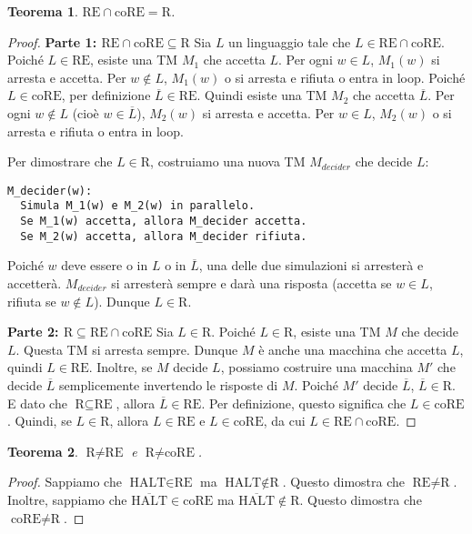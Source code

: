 \documentclass[a4paper]{article}
\newtheorem{theorem}{Teorema}
\begin{document}
\begin{theorem}
$\text{RE} \cap \text{coRE} = \text{R}$.
\end{theorem}
\begin{proof}
\textbf{Parte 1: $\text{RE} \cap \text{coRE} \subseteq \text{R}$}
Sia $L$ un linguaggio tale che $L \in \text{RE} \cap \text{coRE}$.
Poiché $L \in \text{RE}$, esiste una TM $M_1$ che accetta $L$. Per ogni $w \in L$, $M_1(w)$ si arresta e accetta. Per $w \notin L$, $M_1(w)$ o si arresta e rifiuta o entra in loop.
Poiché $L \in \text{coRE}$, per definizione $\overline{L} \in \text{RE}$. Quindi esiste una TM $M_2$ che accetta $\overline{L}$. Per ogni $w \notin L$ (cioè $w \in \overline{L}$), $M_2(w)$ si arresta e accetta. Per $w \in L$, $M_2(w)$ o si arresta e rifiuta o entra in loop.

Per dimostrare che $L \in \text{R}$, costruiamo una nuova TM $M_{decider}$ che decide $L$:
\begin{verbatim}
M_decider(w):
  Simula M_1(w) e M_2(w) in parallelo.
  Se M_1(w) accetta, allora M_decider accetta.
  Se M_2(w) accetta, allora M_decider rifiuta.
\end{verbatim}
Poiché $w$ deve essere o in $L$ o in $\overline{L}$, una delle due simulazioni si arresterà e accetterà. $M_{decider}$ si arresterà sempre e darà una risposta (accetta se $w \in L$, rifiuta se $w \notin L$). Dunque $L \in \text{R}$.

\textbf{Parte 2: $\text{R} \subseteq \text{RE} \cap \text{coRE}$}
Sia $L \in \text{R}$.
Poiché $L \in \text{R}$, esiste una TM $M$ che decide $L$. Questa TM si arresta sempre. Dunque $M$ è anche una macchina che accetta $L$, quindi $L \in \text{RE}$.
Inoltre, se $M$ decide $L$, possiamo costruire una macchina $M'$ che decide $\overline{L}$ semplicemente invertendo le risposte di $M$. Poiché $M'$ decide $\overline{L}$, $\overline{L} \in \text{R}$. E dato che $\text{R} \subseteq \text{RE}$, allora $\overline{L} \in \text{RE}$. Per definizione, questo significa che $L \in \text{coRE}$.
Quindi, se $L \in \text{R}$, allora $L \in \text{RE}$ e $L \in \text{coRE}$, da cui $L \in \text{RE} \cap \text{coRE}$.
\end{proof}

\begin{theorem}
$\text{R} \neq \text{RE}$ e $\text{R} \neq \text{coRE}$.
\end{theorem}
\begin{proof}
Sappiamo che $\text{HALT} \in \text{RE}$ ma $\text{HALT} \notin \text{R}$. Questo dimostra che $\text{RE} \neq \text{R}$.
Inoltre, sappiamo che $\overline{\text{HALT}} \in \text{coRE}$ ma $\overline{\text{HALT}} \notin \text{R}$. Questo dimostra che $\text{coRE} \neq \text{R}$.
\end{proof}
\end{document}

